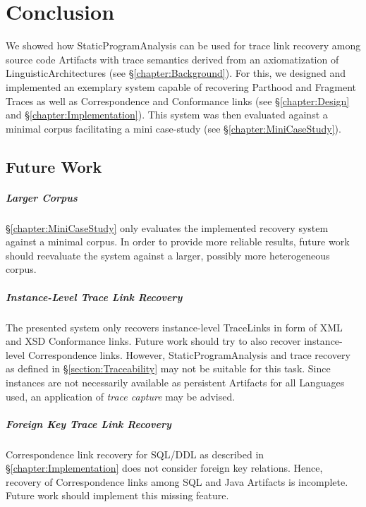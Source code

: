 \chapter{Conclusion}
\label{chapter:Conclusion}
We showed how \gls{StaticProgramAnalysis} can be used for trace link recovery among source code \glspl{Artifact} with trace semantics derived from an axiomatization of \glspl{LinguisticArchitecture} (see §\ref{chapter:Background}).
For this, we designed and implemented an exemplary system capable of recovering \gls{Parthood} and \gls{Fragment} \glspl{Trace} as well as \gls{Correspondence} and \gls{Conformance} links (see §\ref{chapter:Design} and §\ref{chapter:Implementation}).
This system was then evaluated against a minimal corpus facilitating a mini case-study (see §\ref{chapter:MiniCaseStudy}).


\section{Future Work}
\label{section:FutureWork}

\paragraph*{Larger Corpus}
§\ref{chapter:MiniCaseStudy} only evaluates the implemented recovery system against a minimal corpus.
In order to provide more reliable results, future work should reevaluate the system against a larger, possibly more heterogeneous corpus.

\paragraph*{Instance-Level Trace Link Recovery}
The presented system only recovers instance-level \glspl{TraceLink} in form of \gls{XML} and \gls{XSD} \gls{Conformance} links.
Future work should try to also recover instance-level \gls{Correspondence} links.
However, \gls{StaticProgramAnalysis} and trace recovery as defined in §\ref{section:Traceability} may not be suitable for this task.
Since instances are not necessarily available as persistent \glspl{Artifact} for all \glspl{Language} used, an application of \textit{trace capture} \cite{DBLP:books/daglib/p/GotelCHZEGDAMM12} may be advised.

\paragraph*{Foreign Key Trace Link Recovery}
\Gls{Correspondence} link recovery for \gls{SQL/DDL} as described in §\ref{chapter:Implementation} does not consider foreign key relations.
Hence, recovery of \gls{Correspondence} links among \gls{SQL} and \gls{Java} \glspl{Artifact} is incomplete.
Future work should implement this missing feature.

